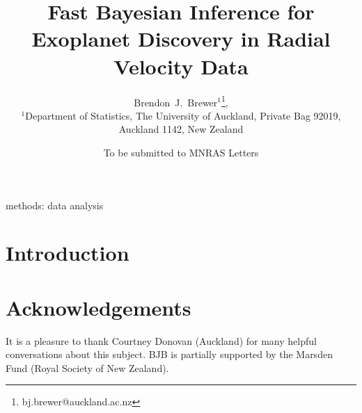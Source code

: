 \documentclass[useAMS,usenatbib]{mn2e}
\title[]
{Fast Bayesian Inference for Exoplanet Discovery in Radial Velocity Data}
\author[Brewer]{%
  Brendon~J.~Brewer$^{1}$\thanks{bj.brewer@auckland.ac.nz},
  \medskip\\
  $^1$Department of Statistics, The University of Auckland, Private Bag 92019, Auckland 1142, New Zealand}
\begin{document}
             
\date{To be submitted to MNRAS Letters}
             
\maketitle

\label{firstpage}


\begin{abstract}
\end{abstract}

\begin{keywords}
methods: data analysis
\end{keywords}


\section{Introduction}

\vspace{-0.5cm}
\section*{Acknowledgements}
It is a pleasure to thank Courtney Donovan (Auckland) for many helpful
conversations about this subject. BJB is partially
supported by the Marsden Fund (Royal Society of New Zealand).

\begin{thebibliography}{99}
\end{thebibliography}
\end{document}
